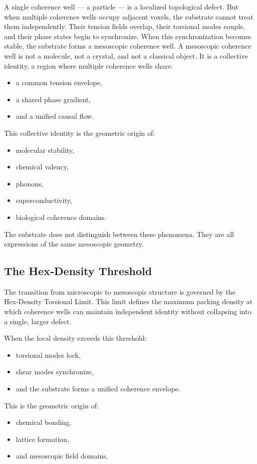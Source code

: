 \documentclass[reprint,amsmath,amssymb,aps,prl,floatfix]{revtex4-2}
\begin{document}
\begin{itemize}
A single coherence well — a particle — is a localized topological defect. But when multiple coherence wells occupy adjacent voxels, the substrate cannot treat them independently. Their tension fields overlap, their torsional modes couple, and their phase states begin to synchronize. When this synchronization becomes stable, the substrate forms a mesoscopic coherence well.
\medskip
A mesoscopic coherence well is not a molecule, not a crystal, and not a classical object. It is a collective identity, a region where multiple coherence wells share:
\begin{itemize}
\item a common tension envelope,  
\item a shared phase gradient,  
\item and a unified causal flow.
\end{itemize}
\medskip
This collective identity is the geometric origin of:
\begin{itemize}
\item molecular stability,  
\item chemical valency,  
\item phonons,  
\item superconductivity,  
\item biological coherence domains.
\end{itemize}
\medskip
The substrate does not distinguish between these phenomena. They are all expressions of the same mesoscopic geometry.

\subsection{The Hex‑Density Threshold}

The transition from microscopic to mesoscopic structure is governed by the Hex‑Density Torsional Limit. This limit defines the maximum packing density at which coherence wells can maintain independent identity without collapsing into a single, larger defect.
\medskip

When the local density exceeds this threshold:
\begin{itemize}
\item torsional modes lock,  
\item shear modes synchronize,  
\item and the substrate forms a unified coherence envelope.
\end{itemize}
\medskip

This is the geometric origin of:
\begin{itemize}
\item chemical bonding,  
\item lattice formation,  
\item and mesoscopic field domains.
\end{itemize}
\medskip


\end{itemize}
\end{document}
